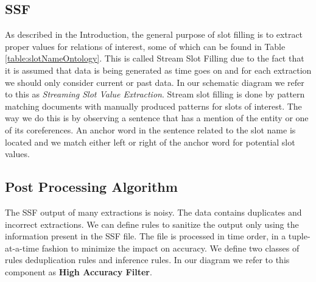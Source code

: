 \subsection{SSF}
As described in the Introduction, the general purpose of slot filling is to extract proper values for relations of interest, some of which can be found in Table \ref{table:slotNameOntology}. This is called Stream Slot Filling due to the fact that it is assumed that data is being generated as time goes on and for each extraction we should only consider current or past data. In our schematic diagram we refer to this as \textit{Streaming Slot Value Extraction}. Stream slot filling is done by pattern matching documents with manually 
produced patterns for slots of interest. The way we do this is by observing a 
sentence that has a mention of the entity or one of its coreferences. An 
anchor word in the sentence related to the slot name is located and we match 
either left or right of the anchor word for potential slot values. 

\subsection{Post Processing Algorithm}

The SSF output of many extractions is noisy. The data contains duplicates and 
incorrect extractions. We can define rules to sanitize the output only using 
the information present in the SSF file. The file is processed in time order, 
in a tuple-at-a-time fashion to minimize the impact on accuracy. We define 
two classes of rules deduplication rules and inference rules. In our diagram we refer to this component as \textbf{High Accuracy Filter}.
